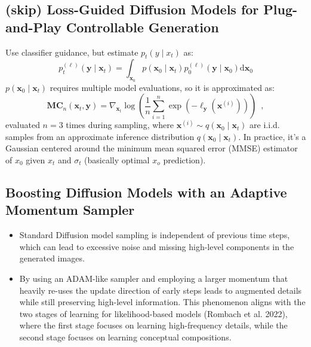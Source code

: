 \documentclass{article}
\begin{document}
\subsection{(skip) Loss-Guided Diffusion Models for Plug-and-Play Controllable Generation}
Use classifier guidance, but estimate $p_t(y\mid x_t)$ as:
$$
p_t^{(\ell)}\left(\mathbf{y} \mid \mathbf{x}_t\right)=\int_{\mathbf{x}_0} p\left(\mathbf{x}_0 \mid \mathbf{x}_t\right) p_0^{(\ell)}\left(\mathbf{y} \mid \mathbf{x}_0\right) \mathrm{d} \mathbf{x}_0
$$
$p\left(\mathbf{x}_0 \mid \mathbf{x}_t\right)$ requires multiple model evaluations, so it is approximated as:
$$
\mathbf{M C}_n\left(\mathbf{x}_t, \mathbf{y}\right)=\nabla_{\mathbf{x}_t} \log \left(\frac{1}{n} \sum_{i=1}^n \exp \left(-\ell_{\mathbf{y}}\left(\mathbf{x}^{(i)}\right)\right)\right)\enspace,
$$
evaluated $n=3$ times during sampling, where $\mathbf{x}^{(i)} \sim q\left(\mathbf{x}_0 \mid \mathbf{x}_t\right)$ are i.i.d. samples from an approximate inference distribution $q\left(\mathbf{x}_0 \mid \mathbf{x}_t\right)$. In practice, it's a Gaussian centered around the minimum mean squared error (MMSE) estimator of $x_0$ given $x_t$ and $\sigma_t$  (basically optimal $x_o$ prediction).

\subsection{\color{ForestGreen} Boosting Diffusion Models with an Adaptive Momentum Sampler}


\begin{itemize}
    \item Standard Diffusion model sampling is independent of previous time steps, which can lead to excessive noise and missing high-level components in the generated images.
    \item By using an ADAM-like sampler and employing a larger momentum that heavily re-uses the update direction of early steps leads to augmented details while still preserving high-level information. This phenomenon aligns with the two stages of learning for likelihood-based models (Rombach et al. 2022), where the first stage focuses on learning high-frequency details, while the second stage focuses on learning conceptual compositions.
\end{itemize}
\end{document}
